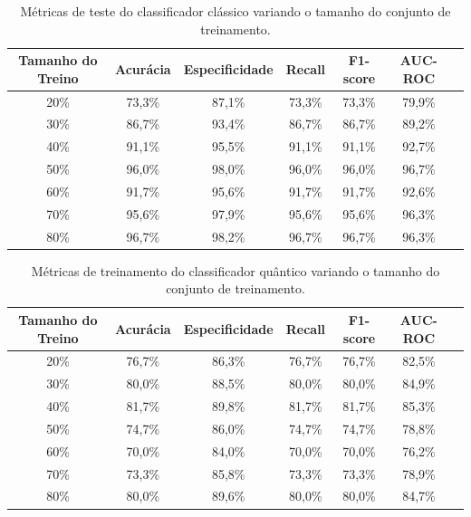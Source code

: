 \begin{table}[H]
\centering
\caption{Métricas de teste do classificador clássico variando o tamanho do conjunto de treinamento.}
\begin{tabular}{|c|c|c|c|c|c|c|}
\hline
\textbf{Tamanho do Treino} & \textbf{Acurácia} & \textbf{Especificidade} & \textbf{Recall} & \textbf{F1-score} & \textbf{AUC-ROC} \\ \hline
20\% & 73,3\% & 87,1\% & 73,3\% & 73,3\% & 79,9\% \\ \hline
30\% & 86,7\% & 93,4\% & 86,7\% & 86,7\% & 89,2\% \\ \hline
40\% & 91,1\% & 95,5\% & 91,1\% & 91,1\% & 92,7\% \\ \hline
50\% & 96,0\% & 98,0\% & 96,0\% & 96,0\% & 96,7\% \\ \hline
60\% & 91,7\% & 95,6\% & 91,7\% & 91,7\% & 92,6\% \\ \hline
70\% & 95,6\% & 97,9\% & 95,6\% & 95,6\% & 96,3\% \\ \hline
80\% & 96,7\% & 98,2\% & 96,7\% & 96,7\% & 96,3\% \\ \hline
\end{tabular}
\end{table}

\begin{table}[H]
\centering
\caption{Métricas de treinamento do classificador quântico variando o tamanho do conjunto de treinamento.}
\begin{tabular}{|c|c|c|c|c|c|c|}
\hline
\textbf{Tamanho do Treino} & \textbf{Acurácia} & \textbf{Especificidade} & \textbf{Recall} & \textbf{F1-score} & \textbf{AUC-ROC} \\ \hline
20\% & 76,7\% & 86,3\% & 76,7\% & 76,7\% & 82,5\% \\ \hline
30\% & 80,0\% & 88,5\% & 80,0\% & 80,0\% & 84,9\% \\ \hline
40\% & 81,7\% & 89,8\% & 81,7\% & 81,7\% & 85,3\% \\ \hline
50\% & 74,7\% & 86,0\% & 74,7\% & 74,7\% & 78,8\% \\ \hline
60\% & 70,0\% & 84,0\% & 70,0\% & 70,0\% & 76,2\% \\ \hline
70\% & 73,3\% & 85,8\% & 73,3\% & 73,3\% & 78,9\% \\ \hline
80\% & 80,0\% & 89,6\% & 80,0\% & 80,0\% & 84,7\% \\ \hline
\end{tabular}
\end{table}

